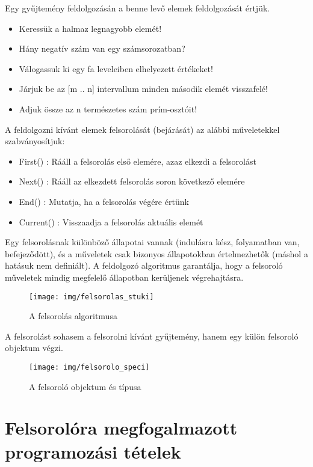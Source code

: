 \documentclass[margin=0px]{article}
\begin{document}
	\noindent Egy gyűjtemény feldolgozásán a benne levő elemek
	feldolgozását értjük.
	\begin{itemize}
		\item	Keressük a halmaz legnagyobb elemét!
		\item	Hány negatív szám van egy számsorozatban?
		\item	Válogassuk ki egy fa leveleiben elhelyezett értékeket!
		\item	Járjuk be az [m .. n] intervallum minden második elemét visszafelé!
		\item	Adjuk össze az n természetes szám prím-osztóit!
	\end{itemize}
	
	\noindent A feldolgozni kívánt elemek felsorolását (bejárását) az alábbi
	műveletekkel szabványosítjuk:
	\begin{itemize}
		\item	First() : Rááll a felsorolás első elemére, azaz elkezdi a felsorolást
		\item	Next() : Rááll az elkezdett felsorolás soron következő elemére
		\item	End() : Mutatja, ha a felsorolás végére értünk
		\item	Current() : Visszaadja a felsorolás aktuális elemét
	\end{itemize}
	
	Egy felsorolásnak különböző állapotai vannak (indulásra kész,
	folyamatban van, befejeződött), és a műveletek csak bizonyos
	állapotokban értelmezhetők (máshol a hatásuk nem definiált). 
	A feldolgozó algoritmus garantálja,	hogy a felsoroló műveletek mindig
	megfelelő állapotban kerüljenek	végrehajtásra.

	\begin{figure}[H]
		\centering
		\texttt{[image: img/felsorolas\_stuki]}
		\caption{A felsorolás algoritmusa}
		\label{fig:felsorolas_stuki}
	\end{figure}
	
	A felsorolást sohasem a felsorolni kívánt gyűjtemény, hanem
	egy külön felsoroló objektum végzi. 

	\begin{figure}[H]
		\centering
		\texttt{[image: img/felsorolo\_speci]}
		\caption{A felsoroló objektum és típusa}
		\label{fig:felsorolas_stuki}
	\end{figure}
	
	\section{Felsorolóra megfogalmazott programozási tételek}
	
\end{document}
